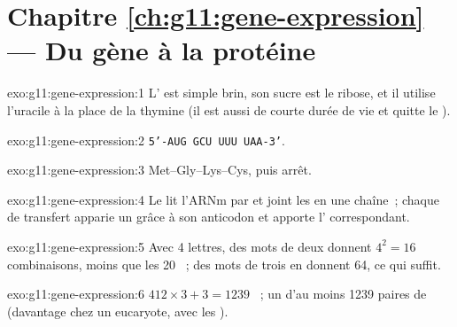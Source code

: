 \section*{Chapitre \ref{ch:g11:gene-expression} --- Du gène à la protéine}

\begin{solution}{exo:g11:gene-expression:1}
L' est simple brin, son sucre est le ribose, et il utilise l'uracile
à la place de la thymine (il est aussi de courte durée de vie et quitte
le ).
\end{solution}

\begin{solution}{exo:g11:gene-expression:2}
\texttt{5'-AUG GCU UUU UAA-3'}.
\end{solution}

\begin{solution}{exo:g11:gene-expression:3}
Met--Gly--Lys--Cys, puis arrêt.
\end{solution}

\begin{solution}{exo:g11:gene-expression:4}
Le  lit l'ARNm  par  et joint les  en
une chaîne~; chaque  de transfert apparie un  grâce à son
anticodon et apporte l' correspondant.
\end{solution}

\begin{solution}{exo:g11:gene-expression:5}
Avec 4 lettres, des mots de deux donnent $4^2 = 16$ combinaisons, moins
que les 20 ~; des mots de trois en donnent 64, ce qui
suffit.
\end{solution}

\begin{solution}{exo:g11:gene-expression:6}
$412 \times 3 + 3 = 1239$ ~; un  d'au moins 1239 paires
de  (davantage chez un eucaryote, avec les ).
\end{solution}

